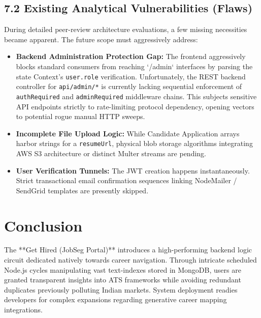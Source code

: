 \documentclass[12pt,a4paper,oneside]{report}
\begin{document}
\section{7.2 Existing Analytical Vulnerabilities (Flaws)}
During detailed peer-review architecture evaluations, a few missing necessities became apparent. The future scope must aggressively address:
\begin{itemize}
    \item \textbf{Backend Administration Protection Gap:} The frontend aggressively blocks standard consumers from reaching `/admin` interfaces by parsing the state Context's \texttt{user.role} verification. Unfortunately, the REST backend controller for \texttt{api/admin/*} is currently lacking sequential enforcement of \texttt{authRequired} and \texttt{adminRequired} middleware chains. This subjects sensitive API endpoints strictly to rate-limiting protocol dependency, opening vectors to potential rogue manual HTTP sweeps.
    \item \textbf{Incomplete File Upload Logic:} While Candidate Application arrays harbor strings for a \texttt{resumeUrl}, physical blob storage algorithms integrating AWS S3 architecture or distinct Multer streams are pending.
    \item \textbf{User Verification Tunnels:} The JWT creation happens instantaneously. Strict transactional email confirmation sequences linking NodeMailer / SendGrid templates are presently skipped.
\end{itemize}

\chapter{Conclusion}
The **Get Hired (JobSeg Portal)** introduces a high-performing backend logic circuit dedicated natively towards career navigation. Through intricate scheduled Node.js cycles manipulating vast text-indexes stored in MongoDB, users are granted transparent insights into ATS frameworks while avoiding redundant duplicates previously polluting Indian markets. System deployment readies developers for complex expansions regarding generative career mapping integrations.
\end{document}
